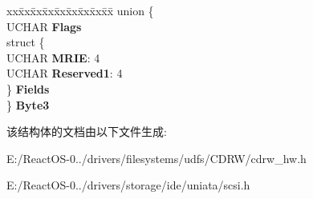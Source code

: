 \begin{DoxyCompactItemize}
\begin{tabbing}
\end{tabbing}\item 
\mbox{\label{struct___m_o_d_e___f_a_i_l___r_e_p_o_r_t___p_a_g_e_a23e8bfc3245952090e4c7832616153e9}} 
\begin{tabbing}
xx\=xx\=xx\=xx\=xx\=xx\=xx\=xx\=xx\=\kill
union \{\\
\>UCHAR {\bfseries Flags}\\
\>struct \{\\
\>\>UCHAR {\bfseries MRIE}: 4\\
\>\>UCHAR {\bfseries Reserved1}: 4\\
\>\} {\bfseries Fields}\\
\} {\bfseries Byte3}\\

\end{tabbing}\end{DoxyCompactItemize}


该结构体的文档由以下文件生成\+:\begin{DoxyCompactItemize}
\item 
E\+:/\+React\+O\+S-\/0../drivers/filesystems/udfs/\+C\+D\+R\+W/cdrw\+\_\+hw.\+h\item 
E\+:/\+React\+O\+S-\/0../drivers/storage/ide/uniata/scsi.\+h\end{DoxyCompactItemize}
